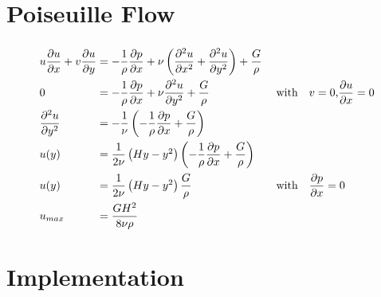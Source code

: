 \documentclass[
	pdftex,             %
	12pt,				%
	a4paper,		   	%
	english,				%
	oneside,			%
]{article}
\begin{document}
\clearpage

\section{Poiseuille Flow}

\begin{eqnarray}
\begin{split}
\arraycolsep=1.4pt\def\arraystretch{2.2}
\begin{array}{lcll}
u\dfrac{\partial u}{\partial x} + v\dfrac{\partial u}{\partial y}
&=& 
-\dfrac{1}{\rho} \dfrac{\partial p}{\partial x}
+ \nu \left( \dfrac{\partial^2 u}{\partial x^2} + \dfrac{\partial^2 u}{\partial y^2} \right)
+ \dfrac{G}{\rho}&
\\
0 &=& -\dfrac{1}{\rho} \dfrac{\partial p}{\partial x} + \nu \dfrac{\partial^2 u}{\partial y^2} + \dfrac{G}{\rho}
&\textnormal{~~~with~~~} v = 0 \textnormal{,} \dfrac{\partial u}{\partial x} = 0
\\
\dfrac{\partial^2 u}{\partial y^2} 
&=&
-\dfrac{1}{\nu} \left( -\dfrac{1}{\rho} \dfrac{\partial p}{\partial x} + \dfrac{G}{\rho}\right)&
\\
u(y) &=& \dfrac{1}{2\nu} \left( Hy - y^2 \right) 
         \left( -\dfrac{1}{\rho} \dfrac{\partial p}{\partial x} + \dfrac{G}{\rho} \right)&
\\
u(y) &=& \dfrac{1}{2\nu} \left( Hy - y^2 \right) \dfrac{G}{\rho}
&\textnormal{~~~with~~~}
\dfrac{\partial p}{\partial x} = 0
\\
u_{max} &=& \dfrac{GH^2}{8\nu\rho}&
\end{array}
\end{split}
\end{eqnarray}

\section{Implementation}
\end{document}
